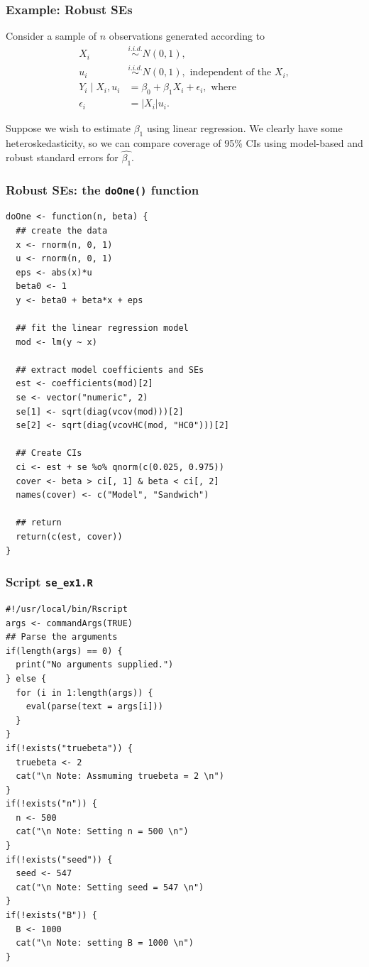 \documentclass[12pt, 
hyperref={colorlinks=true, linkcolor=blue, urlcolor=cyan}]{beamer}
\newcommand{\abs}[1]{\left\lvert#1\right\rvert}
\begin{document}
\begin{frame}[fragile]
\frametitle{Example: Robust SEs}
Consider a sample of $n$ observations generated according to
\begin{align*}
X_i &\stackrel{i.i.d.}{\sim} N(0, 1), \\
u_i &\stackrel{i.i.d.}{\sim} N(0, 1), \text{ independent of the } X_i, \\
Y_i \mid X_i, u_i &= \beta_0 + \beta_1 X_i + \epsilon_i, \text{ where} \\
\epsilon_i &= \abs{X_i}u_i.
\end{align*}

Suppose we wish to estimate $\beta_1$ using linear regression. We clearly have some heteroskedasticity, so we can compare coverage of 95\% CIs using model-based and robust standard errors for $\hat{\beta_1}$.
\end{frame}

\begin{frame}[fragile]
\frametitle{Robust SEs: the \texttt{doOne()} function}
{\scriptsize
\begin{verbatim}
doOne <- function(n, beta) {
  ## create the data
  x <- rnorm(n, 0, 1)
  u <- rnorm(n, 0, 1)
  eps <- abs(x)*u
  beta0 <- 1
  y <- beta0 + beta*x + eps
  
  ## fit the linear regression model
  mod <- lm(y ~ x)
  
  ## extract model coefficients and SEs
  est <- coefficients(mod)[2]
  se <- vector("numeric", 2)
  se[1] <- sqrt(diag(vcov(mod)))[2]
  se[2] <- sqrt(diag(vcovHC(mod, "HC0")))[2]
  
  ## Create CIs
  ci <- est + se %o% qnorm(c(0.025, 0.975))
  cover <- beta > ci[, 1] & beta < ci[, 2]
  names(cover) <- c("Model", "Sandwich")
  
  ## return
  return(c(est, cover))
}
\end{verbatim}
}
\end{frame}

\begin{frame}[fragile]
\frametitle{Script \texttt{se\_ex1.R}}
{\fontsize{9pt}{7.2}\selectfont
\begin{verbatim}
#!/usr/local/bin/Rscript
args <- commandArgs(TRUE)
## Parse the arguments
if(length(args) == 0) {
  print("No arguments supplied.")
} else {
  for (i in 1:length(args)) {
    eval(parse(text = args[i]))
  }
}
if(!exists("truebeta")) {
  truebeta <- 2
  cat("\n Note: Assmuming truebeta = 2 \n")
}
if(!exists("n")) {
  n <- 500
  cat("\n Note: Setting n = 500 \n")
}
if(!exists("seed")) {
  seed <- 547
  cat("\n Note: Setting seed = 547 \n")
}
if(!exists("B")) {
  B <- 1000
  cat("\n Note: setting B = 1000 \n")
}
\end{verbatim}
}
\end{frame}
\end{document}
